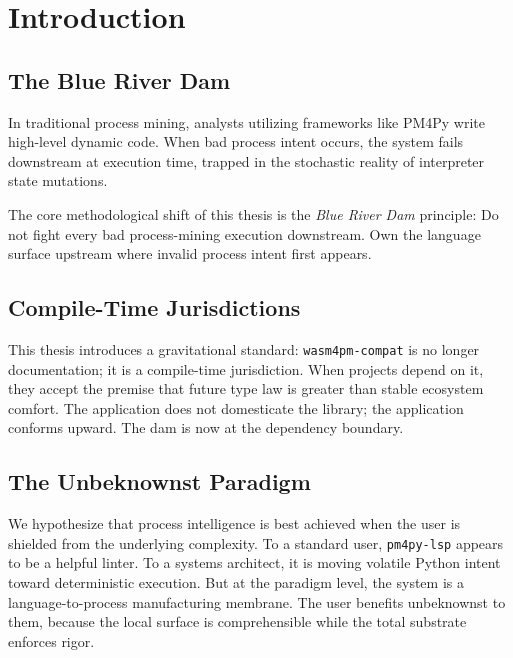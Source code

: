 
\chapter{Introduction}
\section{The Blue River Dam}
In traditional process mining, analysts utilizing frameworks like PM4Py write high-level dynamic code. When bad process intent occurs, the system fails downstream at execution time, trapped in the stochastic reality of interpreter state mutations. 

The core methodological shift of this thesis is the \textit{Blue River Dam} principle: Do not fight every bad process-mining execution downstream. Own the language surface upstream where invalid process intent first appears.

\section{Compile-Time Jurisdictions}
This thesis introduces a gravitational standard: \texttt{wasm4pm-compat} is no longer documentation; it is a compile-time jurisdiction. When projects depend on it, they accept the premise that future type law is greater than stable ecosystem comfort. The application does not domesticate the library; the application conforms upward. The dam is now at the dependency boundary.

\section{The Unbeknownst Paradigm}
We hypothesize that process intelligence is best achieved when the user is shielded from the underlying complexity. To a standard user, \texttt{pm4py-lsp} appears to be a helpful linter. To a systems architect, it is moving volatile Python intent toward deterministic execution. But at the paradigm level, the system is a language-to-process manufacturing membrane. The user benefits unbeknownst to them, because the local surface is comprehensible while the total substrate enforces rigor.
